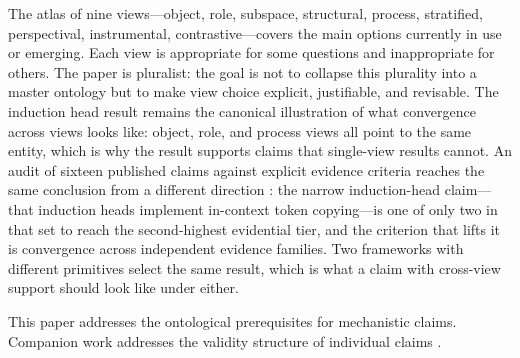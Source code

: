 \documentclass{article}
\begin{document}
The atlas of nine views---object, role, subspace, structural, process,
stratified, perspectival, instrumental, contrastive---covers the main
options currently in use or emerging.  Each view is appropriate for some
questions and inappropriate for others.  The paper is pluralist: the
goal is not to collapse this plurality into a master ontology but to
make view choice explicit, justifiable, and revisable.  The induction
head result remains the canonical illustration of what convergence
across views looks like: object, role, and process views all point to
the same entity, which is why the result supports claims that
single-view results cannot.  An audit of sixteen published claims against
explicit evidence criteria reaches the same conclusion from a different
direction \citep{tower2026mechvalidity}: the narrow induction-head
claim---that induction heads implement in-context token copying---is one
of only two in that set to reach the second-highest evidential tier, and
the criterion that lifts it is convergence across independent evidence
families.  Two frameworks with different primitives select the same
result, which is what a claim with cross-view support should look like
under either.

This paper addresses the ontological prerequisites for mechanistic
claims.  Companion work addresses the validity structure of individual
claims \citep{tower2026mechvalidity}.
\end{document}
